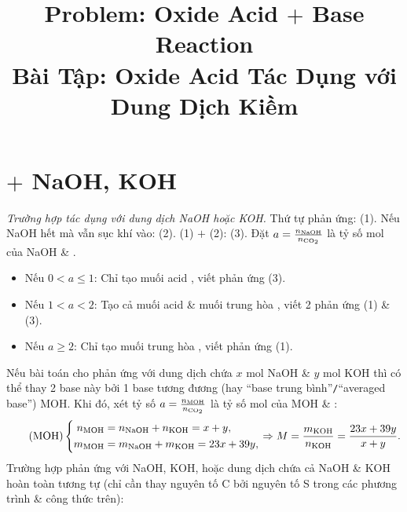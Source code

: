 \documentclass{article}
\title{Problem: Oxide Acid $+$ Base Reaction\\Bài Tập: Oxide Acid Tác Dụng với Dung Dịch Kiềm}
\date{}
\begin{document}
\maketitle
\vspace{-2cm}


\section{ $+$ NaOH, KOH}
\textit{Trường hợp  tác dụng với dung dịch NaOH hoặc KOH.} Thứ tự phản ứng:  (1). Nếu NaOH hết mà vẫn sục khí  vào:  (2). (1) $+$ (2):  (3). Đặt $a = \frac{n_{\rm NaOH}}{n_{\ce{CO2}}}$ là tỷ số mol của NaOH \& .
\begin{itemize}
	\item Nếu $0 < a\le 1$: Chỉ tạo muối acid , viết phản ứng (3).
	\item Nếu $1 < a < 2$: Tạo cả muối acid  \& muối trung hòa , viết 2 phản ứng (1) \& (3).
	\item Nếu $a\ge 2$: Chỉ tạo muối trung hòa , viết phản ứng (1).
\end{itemize}
Nếu bài toán cho  phản ứng với dung dịch chứa $x$ mol NaOH \& $y$ mol KOH thì có thể thay 2 base này bởi 1 base tương đương (hay ``base trung bình''{\tt/}``averaged base'') MOH. Khi đó, xét tỷ số $a = \frac{n_{\rm MOH}}{n_{\ce{CO2}}}$ là tỷ số mol của MOH \& :
\begin{equation}
	\label{MOH}
	\tag{MOH}
	\left\{\begin{split}
		n_{\rm MOH} &= n_{\rm NaOH} + n_{\rm KOH} = x + y,\\
		m_{\rm MOH} &= m_{\rm NaOH} + m_{\rm KOH} = 23x + 39y,
	\end{split}\right.\Rightarrow M = \frac{m_{\rm KOH}}{n_{\rm KOH}} = \frac{23x + 39y}{x + y}.
\end{equation}
Trường hợp  phản ứng với NaOH, KOH, hoặc dung dịch chứa cả NaOH \& KOH hoàn toàn tương tự (chỉ cần thay nguyên tố C bởi nguyên tố S trong các phương trình \& công thức trên):
\end{document}
